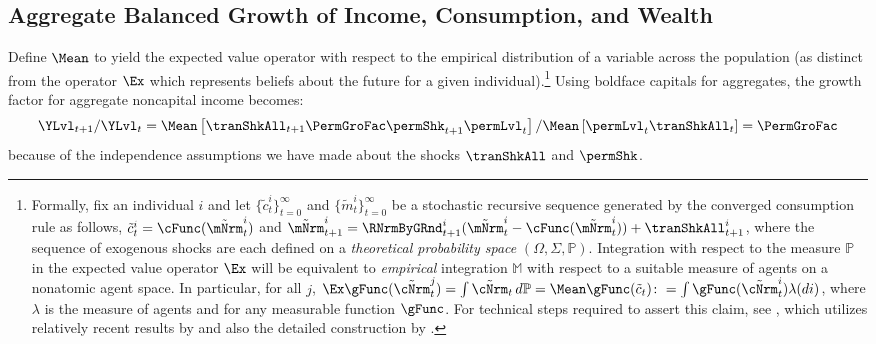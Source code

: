 \documentclass[BufferStockTheory]{subfiles}
\begin{document}



\hypertarget{Growth-Rates-of-Individual-Income-and-Consumption}{}
\subsection{Aggregate Balanced Growth of  Income, Consumption, and Wealth}\label{subsec:cGroEqPermGroFacQ}

Define $\Mean$ to yield the expected value operator with respect to the empirical distribution of a variable across the population (as distinct from the operator $\Ex$ which represents beliefs about the future for a given individual).\footnote{Formally, fix an individual $i$ and let $\{\tilde{c}^{i}_{t}\}_{t=0}^{\infty}$ and $\{\tilde{m}^{i}_{t}\}_{t=0}^{\infty}$ be a stochastic recursive sequence generated by the converged consumption rule as follows, $\tilde{c}^{i}_{t} = \cFunc(\tilde{\mNrm}^{i}_{t})$ and $\tilde{\mNrm}^{i}_{t+1} = \RNrmByGRnd^{i}_{t+1}(\tilde{\mNrm}^{i}_{t} -\cFunc(\tilde{\mNrm}^{i}_{t})) + \tranShkAll^{i}_{t+1}$, where the sequence of exogenous shocks are each defined on a \textit{theoretical probability space} $(\Omega, \Sigma, \mathbb{P})$.
Integration with respect to the measure $\mathbb{P}$ in the expected value operator $\Ex$ will be equivalent to \textit{empirical} integration $\mathbb{M}$ with respect to a suitable measure of agents on a nonatomic agent space.
In particular, for all $j$, $\Ex\gFunc(\tilde{\cNrm}_{t}^{j})  = \int \tilde{\cNrm}_{t}\,d\mathbb{P} =  \Mean\gFunc(\tilde{c}_{t})\colon = \int \gFunc(\tilde{\cNrm}_{t}^{i}) \lambda(di)$, where $\lambda$ is the measure of agents and  for any measurable function $\gFunc$.
For technical steps required to assert this claim, see \cite{Shanker2017a}, which utilizes  relatively recent results by \cite{Sun2009} and also the detailed construction by \cite{Cao2020}.} Using boldface capitals for aggregates, the growth factor for aggregate noncapital income becomes:
\begin{equation*}
  \YLvl_{t+1}/\YLvl_{t}  = \Mean\left[\tranShkAll_{t+1}\PermGroFac \permShk_{t+1}\permLvl_{t}\right]/\Mean\left[\permLvl_{t}\tranShkAll_{t}\right] = \PermGroFac
\end{equation*}
because of the independence assumptions we have made about the shocks $\tranShkAll$ and $\permShk$.
\end{document}
